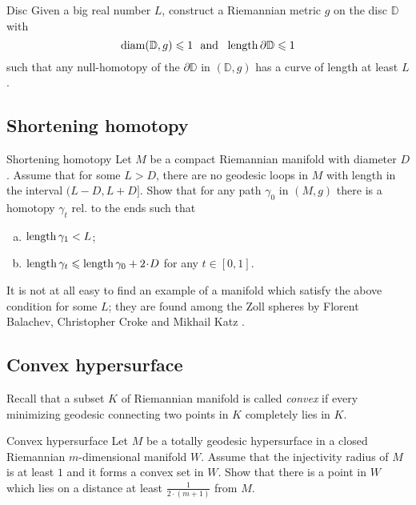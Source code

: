 \begin{pr}{\hard}{Disc}\label{Disc}
Given a big real number $L$,
construct a Riemannian metric $g$ on the disc $\mathbb D$ 
with 
\[\diam(\mathbb D,g)\le 1
\ \ 
\text{and}
\ \ 
\length \partial\mathbb D\le 1  \]
such that any null-homotopy of the $\partial\mathbb D$ in $(\mathbb D,g)$ 
has a curve of length at least $L$.
\end{pr}

\subsection*{Shortening homotopy}

\begin{pr}{}{Shortening homotopy}\label{short-homotopy}
Let $M$ be a compact Riemannian manifold with diameter $D$.
Assume that for some $L>D$,
there are no geodesic loops in $M$
with length in the interval $(L-D,L+ D]$.
Show that for any path $\gamma_0$ in $(M,g)$
there is a homotopy $\gamma_t$ rel. to the ends
such that 
\begin{enumerate}[a)]
\item $\operatorname{\rm length} \gamma_1<L$;
\item $\length \gamma_t\le \length \gamma_0+2\cdot D$ for any $t\in[0,1]$.
 
\end{enumerate}
\end{pr}

It is not at all easy to find an example of a manifold  which satisfy the above condition for some $L$;
they are found among the Zoll spheres
by Florent Balachev, Christopher Croke and Mikhail Katz \cite[see][]{balacheff-croke-katz}.



\subsection*{Convex hypersurface}

Recall that a subset $K$ of Riemannian manifold is called \emph{convex} if every minimizing geodesic connecting two  points in $K$ completely lies in $K$. 

\begin{pr}{}{Convex hypersurface}\label{Convex hypersurface}
Let $M$ be a totally geodesic hypersurface 
in a closed Riemannian $m$-dimensional manifold $W$.
Assume that the injectivity radius of $M$ is at least $1$
and it forms a convex set in $W$.
Show that there is a point in $W$  which lies on a distance at least  
$\frac{1}{2\cdot(m+1)}$ from $M$.
\end{pr}

